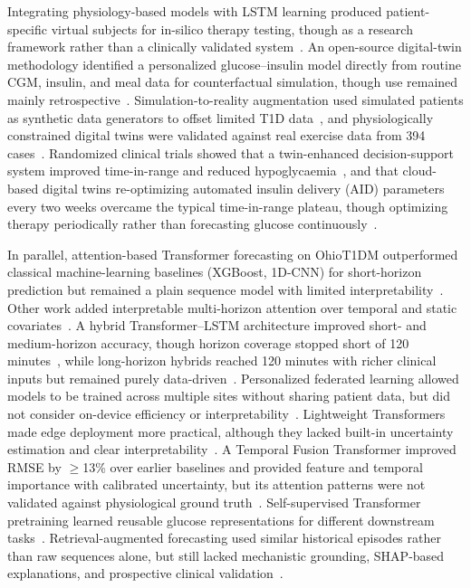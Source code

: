 \documentclass[journal]{IEEEtran}
\begin{document}
Integrating physiology-based models with LSTM learning produced patient-specific virtual subjects for in-silico therapy testing, though as a research framework rather than a clinically validated system~\cite{ref13}. An open-source digital-twin methodology identified a personalized glucose--insulin model directly from routine CGM, insulin, and meal data for counterfactual simulation, though use remained mainly retrospective~\cite{ref14}. Simulation-to-reality augmentation used simulated patients as synthetic data generators to offset limited T1D data~\cite{ref15}, and physiologically constrained digital twins were validated against real exercise data from 394 cases~\cite{ref16}. Randomized clinical trials showed that a twin-enhanced decision-support system improved time-in-range and reduced hypoglycaemia~\cite{ref17}, and that cloud-based digital twins re-optimizing automated insulin delivery (AID) parameters every two weeks overcame the typical time-in-range plateau, though optimizing therapy periodically rather than forecasting glucose continuously~\cite{ref18}.

In parallel, attention-based Transformer forecasting on OhioT1DM outperformed classical machine-learning baselines (XGBoost, 1D-CNN) for short-horizon prediction but remained a plain sequence model with limited interpretability~\cite{ref19}. Other work added interpretable multi-horizon attention over temporal and static covariates~\cite{ref20}. A hybrid Transformer--LSTM architecture improved short- and medium-horizon accuracy, though horizon coverage stopped short of 120 minutes~\cite{ref21}, while long-horizon hybrids reached 120 minutes with richer clinical inputs but remained purely data-driven~\cite{ref22}. Personalized federated learning allowed models to be trained across multiple sites without sharing patient data, but did not consider on-device efficiency or interpretability~\cite{ref24}. Lightweight Transformers made edge deployment more practical, although they lacked built-in uncertainty estimation and clear interpretability~\cite{ref25}. A Temporal Fusion Transformer improved RMSE by $\geq$13\% over earlier baselines and provided feature and temporal importance with calibrated uncertainty, but its attention patterns were not validated against physiological ground truth~\cite{ref26}. Self-supervised Transformer pretraining learned reusable glucose representations for different downstream tasks~\cite{ref27}. Retrieval-augmented forecasting used similar historical episodes rather than raw sequences alone, but still lacked mechanistic grounding, SHAP-based explanations, and prospective clinical validation~\cite{ref29}.
\end{document}

